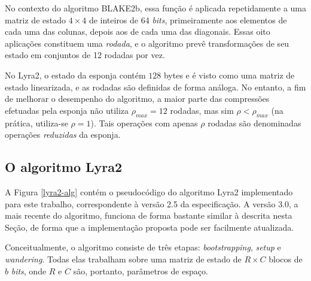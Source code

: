 \documentclass{article}
\begin{document}
No contexto do algoritmo BLAKE2b, essa função é aplicada repetidamente a
uma matriz de estado $4 \times 4$ de inteiros de 64 \emph{bits},
primeiramente aos elementos de cada uma das colunas, depois aos de cada
uma das diagonais. Essas oito aplicações constituem uma \emph{rodada}, e
o algoritmo prevê transformações de seu estado em conjuntos de 12
rodadas por vez.

No Lyra2, o estado da esponja contém $128$ bytes e é visto como uma
matriz de estado linearizada, e as rodadas são definidas de forma
análoga. No entanto, a fim de melhorar o desempenho do algoritmo, a
maior parte das compressões efetuadas pela esponja não utiliza
$\rho_{max} = 12$ rodadas, mas sim $\rho < \rho_{max}$ (na prática,
utiliza-se $\rho = 1$). Tais operações com apenas $\rho$ rodadas são
denominadas operações \emph{reduzidas} da esponja.

\subsection{O algoritmo Lyra2 }\label{sec-lyra2-alg}

A Figura \ref{lyra2-alg} contém o pseudocódigo do algoritmo Lyra2 implementado
para este trabalho, correspondente à versão 2.5 da especificação. A versão 3.0,
a mais recente do algoritmo, funciona de forma bastante similar à descrita
nesta Seção, de forma que a implementação proposta pode ser facilmente
atualizada.

Conceitualmente, o algoritmo consiste de três etapas: \emph{bootstrapping},
\emph{setup} e \emph{wandering}. Todas elas trabalham sobre uma matriz
de estado de $R \times C$ blocos de $b$ \emph{bits}, onde $R$ e $C$
são, portanto, parâmetros de espaço.
\end{document}
